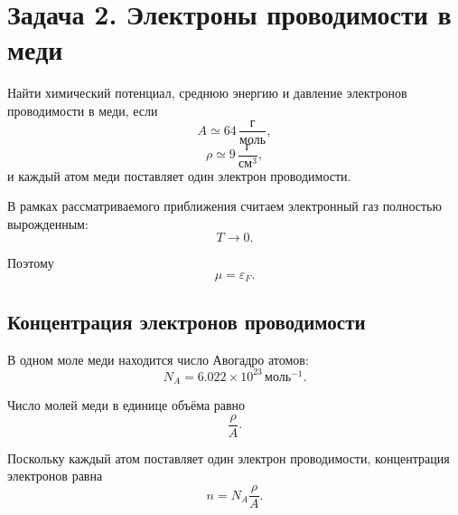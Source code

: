\documentclass[../final.tex]{subfiles}
\begin{document}

\newpage
\section{Задача 2. Электроны проводимости в меди}

Найти химический потенциал, среднюю энергию и давление
электронов проводимости в меди, если
%
\begin{equation*}
    A
    \simeq
    64\,
    \frac{
        \text{г}
    }{
        \text{моль}
    },
\end{equation*}
%
%
\begin{equation*}
    \rho
    \simeq
    9\,
    \frac{
        \text{г}
    }{
        \text{см}^3
    },
\end{equation*}
%
и каждый атом меди поставляет один электрон проводимости.

В рамках рассматриваемого приближения считаем электронный газ
полностью вырожденным:
%
\begin{equation*}
    T\to0.
\end{equation*}

Поэтому
%
\begin{equation*}
    \mu
    =
    \varepsilon_F.
\end{equation*}



\subsection*{Концентрация электронов проводимости}

В одном моле меди находится число Авогадро атомов:
%
\begin{equation*}
    N_A
    =
    6.022\times10^{23}\,
    \text{моль}^{-1}.
\end{equation*}

Число молей меди в единице объёма равно
%
\begin{equation*}
    \frac{\rho}{A}.
\end{equation*}

Поскольку каждый атом поставляет один электрон проводимости,
концентрация электронов равна
%
\begin{equation*}
    n
    =
    N_A
    \frac{\rho}{A}.
\end{equation*}
\end{document}
